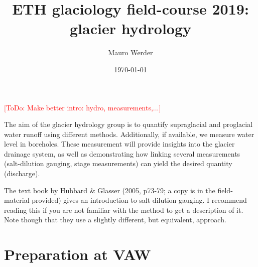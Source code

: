 \documentclass[DIV=15,halfparskip,11pt,headinclude]{scrartcl}
\author{Mauro Werder}
\date{\today}
\title{ETH glaciology field-course 2019:\\ glacier hydrology}
\newcommand{\todo}[1]{\textcolor{red}{[ToDo: #1]}}
\newcommand{\todo}[1]{}
\begin{document}
  \maketitle
  \todo{Make better intro: hydro, measurements,...}

The aim of the glacier hydrology group is to quantify supraglacial and
proglacial water runoff using different methods.  Additionally, if
available, we measure water level in boreholes.  These measurement
will provide insights into the glacier drainage system, as well as
demonstrating how linking several measurements (salt-dilution gauging,
stage measurements) can yield the desired quantity (discharge).

The text book by Hubbard \& Glasser (2005, p73-79; a copy is in the
field-material provided) gives an introduction to salt dilution
gauging.  I recommend reading this if you are not familiar with the
method to get a description of it.  Note though that they use a
slightly different, but equivalent, approach.

\section{Preparation at VAW}

%
%
\end{document}
